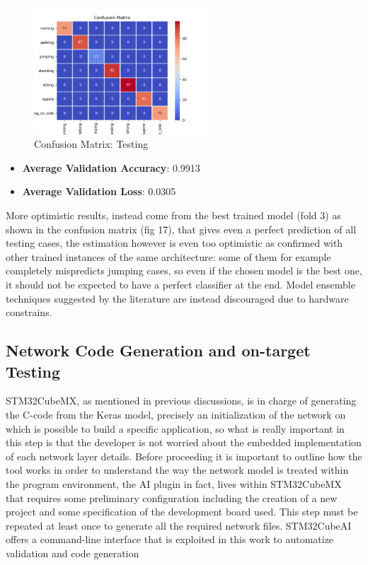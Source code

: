\begin{figure}
	\hfill\includegraphics[width=0.6\textwidth]{figures/confmat_07-04-2020_202659.png}\hspace*{\fill}
	\caption{Confusion Matrix: Testing}\label{fig:9}
	\centering
	\vspace{-60pt}
\end{figure}
\noindent

\begin{itemize}
	\item \textbf{Average Validation Accuracy}: 0.9913
	\item \textbf{Average Validation Loss}: 0.0305
\end{itemize}
More optimistic results, instead come from the best trained model (fold 3) as shown in the confusion matrix (fig 17), that gives even a perfect prediction of all testing cases, the estimation however is even too optimistic as confirmed with other trained instances of the same architecture: some of them for example completely mispredicts jumping cases, so even if the chosen model is the best one, it should not be expected to have a perfect classifier at the end. Model ensemble techniques suggested by the literature are instead discouraged due to hardware constrains.

\subsection{Network Code Generation and on-target Testing}
STM32CubeMX, as mentioned in previous discussions, is in charge of generating the C-code from the Keras model, precisely an initialization of the network on which is possible to build a specific application, so what is really important in this step is that the developer is not worried about the embedded implementation of each network layer details.\newline
Before proceeding it is important to outline how the tool works in order to understand the way the network model is treated within the program environment, the AI plugin in fact, lives within STM32CubeMX that requires some preliminary configuration including the creation of a new project and some specification of the development board used. This step must be repeated at least once to generate all the required network files. STM32CubeAI offers a command-line interface that is exploited in this work to automatize validation and code generation

